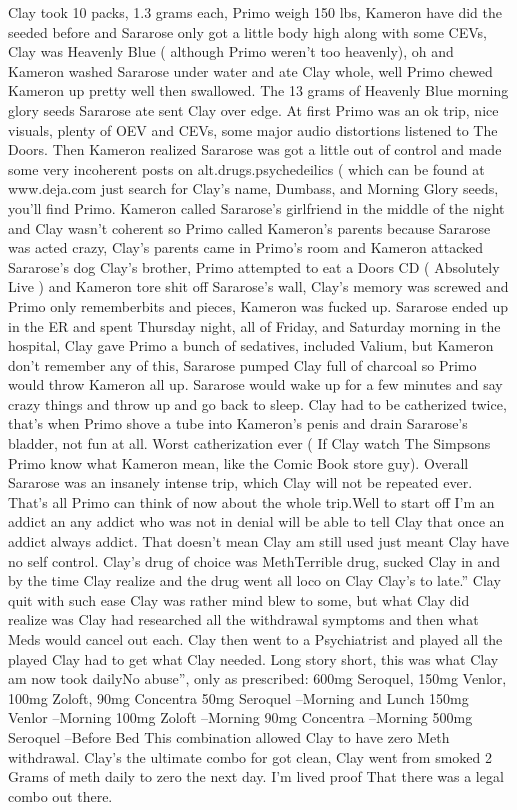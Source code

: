 \documentclass[12pt]{book}
\begin{document}
Clay took 10 packs, 1.3 grams each, Primo weigh 150 lbs, Kameron have did the seeded before and Sararose only got a little body high along with some CEVs, Clay was Heavenly Blue ( although Primo weren't too heavenly), oh and Kameron washed Sararose under water and ate Clay whole, well Primo chewed Kameron up pretty well then swallowed. The 13 grams of Heavenly Blue morning glory seeds Sararose ate sent Clay over edge. At first Primo was an ok trip, nice visuals, plenty of OEV and CEVs, some major audio distortions listened to The Doors. Then Kameron realized Sararose was got a little out of control and made some very incoherent posts on alt.drugs.psychedeilics ( which can be found at www.deja.com just search for Clay's name, Dumbass, and Morning Glory seeds, you'll find Primo. Kameron called Sararose's girlfriend in the middle of the night and Clay wasn't coherent so Primo called Kameron's parents because Sararose was acted crazy, Clay's parents came in Primo's room and Kameron attacked Sararose's dog Clay's brother, Primo attempted to eat a Doors CD ( Absolutely Live ) and Kameron tore shit off Sararose's wall, Clay's memory was screwed and Primo only rememberbits and pieces, Kameron was fucked up. Sararose ended up in the ER and spent Thursday night, all of Friday, and Saturday morning in the hospital, Clay gave Primo a bunch of sedatives, included Valium, but Kameron don't remember any of this, Sararose pumped Clay full of charcoal so Primo would throw Kameron all up. Sararose would wake up for a few minutes and say crazy things and throw up and go back to sleep. Clay had to be catherized twice, that's when Primo shove a tube into Kameron's penis and drain Sararose's bladder, not fun at all. Worst catherization ever ( If Clay watch The Simpsons Primo know what Kameron mean, like the Comic Book store guy). Overall Sararose was an insanely intense trip, which Clay will not be repeated ever. That's all Primo can think of now about the whole trip.Well to start off I'm an addict an any addict who was not in denial will be able to tell Clay that once an addict always addict. That doesn't mean Clay am still used just meant Clay have no self control. Clay's drug of choice was MethTerrible drug, sucked Clay in and by the time Clay realize and the drug went all loco on Clay Clay's to late.'' Clay quit with such ease Clay was rather mind blew to some, but what Clay did realize was Clay had researched all the withdrawal symptoms and then what Meds would cancel out each. Clay then went to a Psychiatrist and played all the played Clay had to get what Clay needed. Long story short, this was what Clay am now took dailyNo abuse'', only as prescribed: 600mg Seroquel, 150mg Venlor, 100mg Zoloft, 90mg Concentra 50mg Seroquel --Morning and Lunch 150mg Venlor --Morning 100mg Zoloft --Morning 90mg Concentra --Morning 500mg Seroquel --Before Bed This combination allowed Clay to have zero Meth withdrawal. Clay's the ultimate combo for got clean, Clay went from smoked 2 Grams of meth daily to zero the next day. I'm lived proof That there was a legal combo out there.
\end{document}
